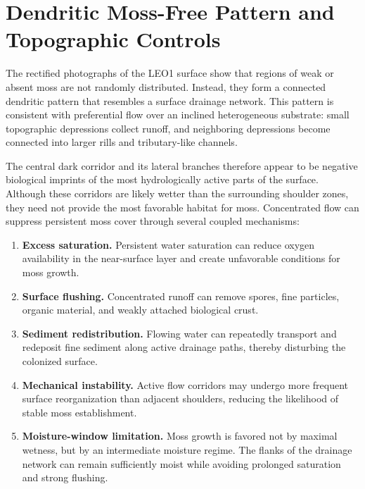 \documentclass[11pt,a4paper]{article}
\begin{document}
\section{Dendritic Moss-Free Pattern and Topographic Controls}

The rectified photographs of the LEO1 surface show that regions of weak or
absent moss are not randomly distributed. Instead, they form a connected
dendritic pattern that resembles a surface drainage network. This pattern is
consistent with preferential flow over an inclined heterogeneous substrate:
small topographic depressions collect runoff, and neighboring depressions
become connected into larger rills and tributary-like channels.

The central dark corridor and its lateral branches therefore appear to be
negative biological imprints of the most hydrologically active parts of the
surface. Although these corridors are likely wetter than the surrounding
shoulder zones, they need not provide the most favorable habitat for moss.
Concentrated flow can suppress persistent moss cover through several coupled
mechanisms:
\begin{enumerate}[leftmargin=1.5em]
	\item \textbf{Excess saturation.} Persistent water saturation can reduce
	oxygen availability in the near-surface layer and create unfavorable
	conditions for moss growth.
	
	\item \textbf{Surface flushing.} Concentrated runoff can remove spores,
	fine particles, organic material, and weakly attached biological crust.
	
	\item \textbf{Sediment redistribution.} Flowing water can repeatedly
	transport and redeposit fine sediment along active drainage paths, thereby
	disturbing the colonized surface.
	
	\item \textbf{Mechanical instability.} Active flow corridors may undergo
	more frequent surface reorganization than adjacent shoulders, reducing the
	likelihood of stable moss establishment.
	
	\item \textbf{Moisture-window limitation.} Moss growth is favored not by
	maximal wetness, but by an intermediate moisture regime. The flanks of the
	drainage network can remain sufficiently moist while avoiding prolonged
	saturation and strong flushing.
\end{enumerate}
\end{document}
